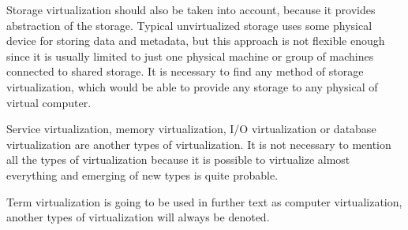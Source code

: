 Storage virtualization should also be taken into account, because it provides abstraction of the storage. Typical unvirtualized storage uses some physical device for storing data and metadata, but this approach is not flexible enough since it is usually limited to just one physical machine or group of machines connected to shared storage. It is necessary to find any method of storage virtualization, which would be able to provide any storage to any physical of virtual computer.

Service virtualization, memory virtualization, I/O virtualization or database virtualization are another types of virtualization. It is not necessary to mention all the types of virtualization because it is possible to virtualize almost everything and emerging of new types is quite probable. 

Term virtualization is going to be used in further text as computer virtualization, another types of virtualization will always be denoted.
